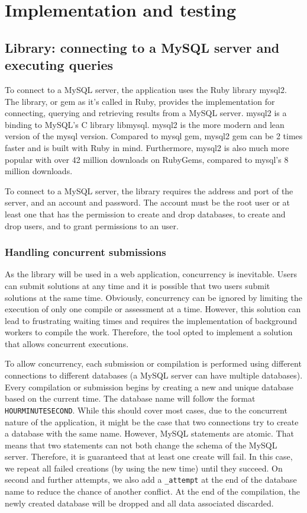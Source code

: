 \chapter{Implementation and testing}

\section{Library: connecting to a MySQL server and executing queries} \label{ch:impllib:sec:connecting}
To connect to a MySQL server, the application uses the Ruby library mysql2. The library, or gem as it's called in Ruby, provides the implementation for connecting, querying and retrieving results from a MySQL server. mysql2 is a binding to MySQL's C library libmysql. mysql2 is the more modern and lean version of the mysql version. Compared to mysql gem, mysql2 gem can be 2 times faster and is built with Ruby in mind. Furthermore, mysql2 is also much more popular with over 42 million downloads on RubyGems, compared to mysql's 8 million downloads.

To connect to a MySQL server, the library requires the address and port of the server, and an account and password. The account must be the root user or at least one that has the permission to create and drop databases, to create and drop users, and to grant permissions to an user.

\subsection{Handling concurrent submissions}

As the library will be used in a web application, concurrency is inevitable. Users can submit solutions at any time and it is possible that two users submit solutions at the same time. Obviously, concurrency can be ignored by limiting the execution of only one compile or assessment at a time. However, this solution can lead to frustrating waiting times and requires the implementation of background workers to compile the work. Therefore, the tool opted to implement a solution that allows concurrent executions.

To allow concurrency, each submission or compilation is performed using different connections to different databases (a MySQL server can have multiple databases).  Every compilation or submission begins by creating a new and unique database based on the current time. The database name will follow the format \texttt{HOURMINUTESECOND}. While this should cover most cases, due to the concurrent nature of the application, it might be the case that two connections try to create a database with the same name. However, MySQL statements are atomic. That means that two statements can not both change the schema of the MySQL server. Therefore, it is guaranteed that at least one create will fail. In this case, we repeat all failed creations (by using the new time) until they succeed. On second and further attempts, we also add a \texttt{_attempt} at the end of the database name to reduce the chance of another conflict. At the end of the compilation, the newly created database will be dropped and all data associated discarded.

